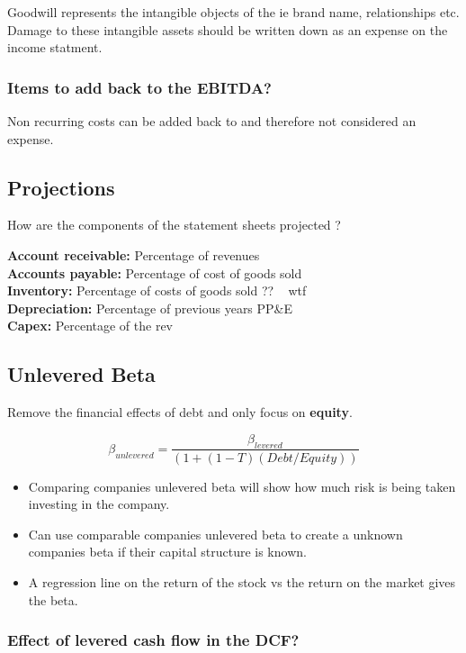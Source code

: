 \documentclass[11pt]{scrartcl} %
\begin{document}
Goodwill represents the intangible objects of the ie brand name, relationships etc.\\

Damage to these intangible assets should be written down as an expense on the income statment.

\subsubsection{Items to add back to the EBITDA?}

Non recurring costs can be added back to and therefore not considered an expense.

\subsection{Projections}

How are the components of the statement sheets projected ?

\textbf{Account receivable:} Percentage of revenues\\
\textbf{Accounts payable:} Percentage of cost of goods sold \\
\textbf{Inventory:} Percentage of costs of goods sold ?? ~ wtf \\
\textbf{Depreciation:} Percentage of previous years PP\&E \\
\textbf{Capex:} Percentage of the rev

\subsection{Unlevered Beta}

Remove the financial effects of debt and only focus on \textbf{equity}.

\[ \beta_{unlevered} = \frac{\beta_{levered}}{(1 + (1-T)(Debt/Equity))} \]

\begin{itemize}
	\item Comparing companies unlevered beta will show how much risk is being taken investing in the company.
	\item Can use comparable companies unlevered beta to create a unknown companies beta if their capital structure is known.
	\item A regression line on the return of the stock vs the return on the market gives the beta.
\end{itemize}

\subsubsection{Effect of levered cash flow in the DCF?}
\end{document}
